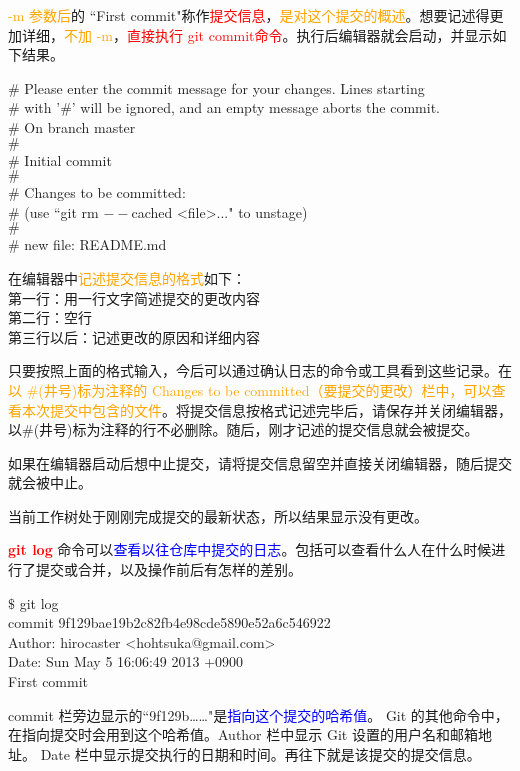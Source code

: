 \documentclass[12pt,a4paper]{article}
\begin{document}
\textcolor{orange}{-m 参数后}的 ``First commit"称作\textcolor{red}{提交信息}，\textcolor{orange}{是对这个提交的概述}。想要记述得更加详细，\textcolor{orange}{不加 -m}，\textcolor{red}{直接执行 git commit命令}。执行后编辑器就会启动，并显示如下结果。

$\#$ Please enter the commit message for your changes. Lines starting \\
$\#$ with '$\#$' will be ignored, and an empty message aborts the commit. \\
$\#$ On branch master \\
$\#$ \\
$\#$ Initial commit \\
$\#$ \\
$\#$ Changes to be committed: \\
$\#$ (use ``git rm $--$cached <file>..." to unstage) \\
$\#$ \\
$\#$ new file: README.md 

在编辑器中\textcolor{orange}{记述提交信息的格式}如下： \\
第一行：用一行文字简述提交的更改内容 \\
第二行：空行 \\
第三行以后：记述更改的原因和详细内容 

只要按照上面的格式输入，今后可以通过确认日志的命令或工具看到这些记录。在\textcolor{orange}{以 $\#$(井号)标为注释的 Changes to be committed（要提交的更改）栏中，可以查看本次提交中包含的文件}。将提交信息按格式记述完毕后，请保存并关闭编辑器，以$\#$(井号)标为注释的行不必删除。随后，刚才记述的提交信息就会被提交。

如果在编辑器启动后想中止提交，请将提交信息留空并直接关闭编辑器，随后提交就会被中止。

当前工作树处于刚刚完成提交的最新状态，所以结果显示没有更改。

\textcolor{red}{\bf git log} 命令可以\textcolor{blue}{查看以往仓库中提交的日志}。包括可以查看什么人在什么时候进行了提交或合并，以及操作前后有怎样的差别。

$\$$ git log \\
commit 9f129bae19b2c82fb4e98cde5890e52a6c546922 \\
Author: hirocaster <hohtsuka@gmail.com> \\
Date: Sun May 5 16:06:49 2013 +0900 \\
First commit 

commit 栏旁边显示的``9f129b……"是\textcolor{blue}{指向这个提交的哈希值}。 Git 的其他命令中，在指向提交时会用到这个哈希值。Author 栏中显示 Git 设置的用户名和邮箱地址。 Date 栏中显示提交执行的日期和时间。再往下就是该提交的提交信息。
\end{document}
